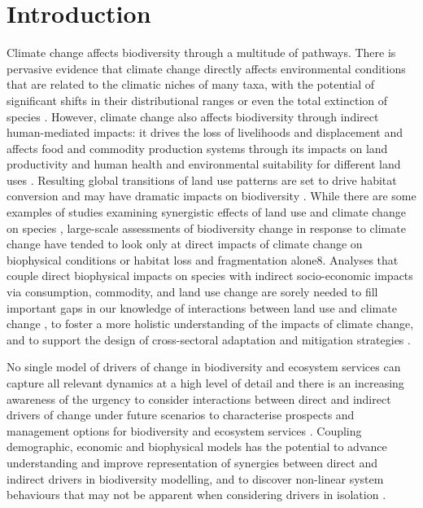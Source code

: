 \section{Introduction}
Climate change affects biodiversity through a multitude of pathways. There is pervasive evidence that climate change directly affects environmental conditions that are related to the climatic niches of many taxa, with the potential of significant shifts in their distributional ranges or even the total extinction of species \citep{ipbes_summary_2019, struebig_targeted_2015}. However, climate change also affects biodiversity through indirect human-mediated impacts: it drives the loss of livelihoods and displacement \citep{mcmichael_climate_2006} and affects food and commodity production systems through its impacts on land productivity and human health\citep{roson_estimation_2016, tol_who_2014} and environmental suitability for different land uses \citep{veldkamp_clue_1996, verburg_combining_2009}. Resulting global transitions of land use patterns are set to drive habitat conversion and may have dramatic impacts on biodiversity \citep{mantyka-pringle_climate_2015,oliver_interactions_2014, newbold2019climate}. While there are some examples of studies examining synergistic effects of land use and climate change on species \citep{brodie_synergistic_2016, brambilla_climate_2016}, large-scale assessments of biodiversity change in response to climate change have tended to look only at direct impacts of climate change on biophysical conditions or habitat loss and fragmentation alone8. Analyses that couple direct biophysical impacts on species with indirect socio-economic impacts via consumption, commodity, and land use change are sorely needed to fill important gaps in our knowledge of interactions between land use and climate change \citep{newbold2019climate}, to foster a more holistic understanding of the impacts of climate change, and to support the design of cross-sectoral adaptation and mitigation strategies \citep{ipbes_summary_2016}.

No single model of drivers of change in biodiversity and ecosystem services can capture all relevant dynamics at a high level of detail and there is an increasing awareness of the urgency to consider interactions between direct and indirect drivers of change under future scenarios to characterise prospects and management options for biodiversity and ecosystem services \citep{ipbes_summary_2016}. Coupling demographic, economic and biophysical models has the potential to advance understanding and improve representation of synergies between direct and indirect drivers in biodiversity modelling, and to discover non-linear system behaviours that may not be apparent when considering drivers in isolation \citep{ipbes_summary_2016}.

